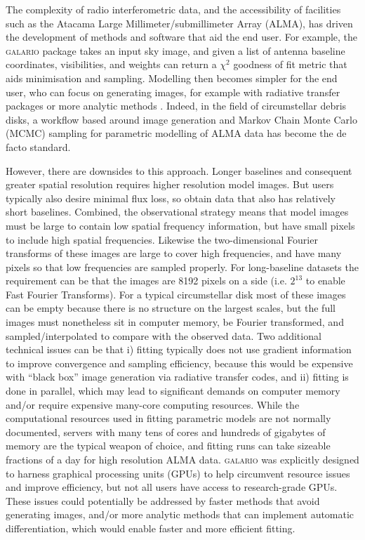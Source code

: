 \documentclass[fleqn,usenatbib]{rasti}
\begin{document}
The complexity of radio interferometric data, and the accessibility of facilities such as the Atacama Large Millimeter/submillimeter Array (ALMA), has driven the development of methods and software that aid the end user. For example, the \textsc{galario} package \citep{2018MNRAS.476.4527T} takes an input sky image, and given a list of antenna baseline coordinates, visibilities, and weights can return a $\chi^2$ goodness of fit metric that aids minimisation and sampling. Modelling then becomes simpler for the end user, who can focus on generating images, for example with radiative transfer packages \citep[e.g. RADMC,][]{2012ascl.soft02015D} or more analytic methods \citep[e.g.][]{2021MNRAS.504.4497C}. Indeed, in the field of circumstellar debris disks, a workflow based around image generation and Markov Chain Monte Carlo (MCMC) sampling for parametric modelling of ALMA data has become the de facto standard.

However, there are downsides to this approach. Longer  baselines and consequent greater spatial resolution requires higher resolution model images. But users typically also desire minimal flux loss, so obtain data that also has relatively short baselines.  Combined, the observational strategy means that model images must be large to contain low spatial frequency information, but have small pixels to include high spatial frequencies. Likewise the two-dimensional Fourier transforms of these images are large to cover high frequencies, and have many pixels so that low frequencies are sampled properly. For long-baseline datasets the requirement can be that the images are 8192 pixels on a side (i.e. $2^{13}$ to enable Fast Fourier Transforms). For a typical circumstellar disk most of these images can be empty because there is no structure on the largest scales, but the full images must nonetheless sit in computer memory, be Fourier transformed, and sampled/interpolated to compare with the observed data. Two additional technical issues can be that i) fitting typically does not use gradient information to improve convergence and sampling efficiency, because this would be expensive with ``black box'' image generation via radiative transfer codes, and ii) fitting is done in parallel, which may lead to significant demands on computer memory and/or require expensive many-core computing resources. While the computational resources used in fitting parametric models are not normally documented, servers with many tens of cores and hundreds of gigabytes of memory are the typical weapon of choice, and fitting runs can take sizeable fractions of a day for high resolution ALMA data. \textsc{galario} was explicitly designed to harness graphical processing units (GPUs) to help circumvent resource issues and improve efficiency, but not all users have access to research-grade GPUs. These issues could potentially be addressed by faster methods that avoid generating images, and/or more analytic methods that can implement automatic differentiation, which would enable faster and more efficient fitting.
\end{document}
